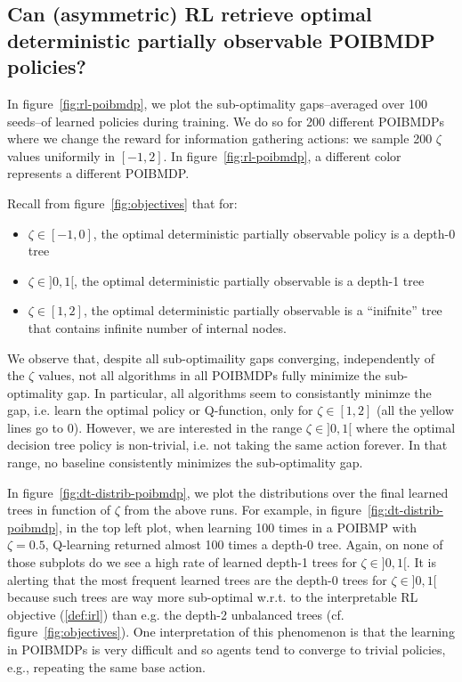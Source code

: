 \subsection{Can (asymmetric) RL retrieve optimal deterministic partially observable POIBMDP policies?}

In figure~\ref{fig:rl-poibmdp}, we plot the sub-optimality gaps--averaged over 100 seeds--of learned policies during training.
We do so for 200 different POIBMDPs where we change the reward for information gathering actions: we sample 200 $\zeta$ values uniformily in $[-1, 2]$.
In figure~\ref{fig:rl-poibmdp}, a different color represents a different POIBMDP.

Recall from figure~\ref{fig:objectives} that for:
\begin{itemize}
    \item $\zeta\in [-1, 0]$, the optimal deterministic partially observable policy is a depth-0 tree
    \item $\zeta\in ]0, 1[$, the optimal deterministic partially observable is a depth-1 tree
    \item $\zeta\in [1, 2]$, the optimal deterministic partially observable is a ``inifnite'' tree that contains infinite number of internal nodes.
\end{itemize}
We observe that, despite all sub-optimaility gaps converging, independently of the $\zeta$ values, not all algorithms in all POIBMDPs fully minimize the sub-optimality gap.
In particular, all algorithms seem to consistantly minimze the gap, i.e. learn the optimal policy or Q-function, only for $\zeta \in [1, 2]$ (all the yellow lines go to 0).
However, we are interested in the range $\zeta\in ]0, 1[$ where the optimal decision tree policy is non-trivial, i.e. not taking the same action forever.
In that range, no baseline consistently minimizes the sub-optimality gap.


In figure~\ref{fig:dt-distrib-poibmdp}, we plot the distributions over the final learned trees in function of $\zeta$ from the above runs.
For example, in figure~\ref{fig:dt-distrib-poibmdp}, in the top left plot, when learning 100 times in a POIBMP with $\zeta=0.5$, Q-learning returned almost 100 times a depth-0 tree.
Again, on none of those subplots do we see a high rate of learned depth-1 trees for $\zeta\in ]0, 1[$.
It is alerting that the most frequent learned trees are the depth-0 trees for $\zeta\in ]0, 1[$ because such trees are way more sub-optimal w.r.t. to the interpretable RL objective (\ref{def:irl}) than e.g. the depth-2 unbalanced trees (cf. figure~\ref{fig:objectives}).  
One interpretation of this phenomenon is that the learning in POIBMDPs is very difficult and so agents tend to converge to trivial policies, e.g., repeating the same base action.

